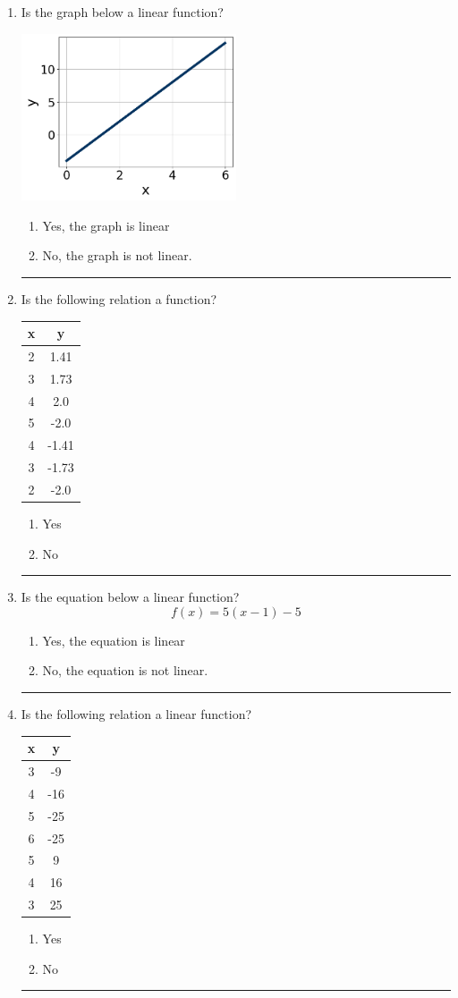 \documentclass[14pt]{extbook}
\newcommand{\litem}[1]{\item#1\hspace*{-1cm}\rule{\textwidth}{0.4pt}}
\begin{document}
\begin{enumerate}
{\begin{enumerate}[label=\Alph*.]
\end{enumerate} }
\litem{
Is the graph below a linear function?
\begin{center}
    \includegraphics[width=0.5\textwidth]{../Figures/MA_8_F_1_2_graphI.png}
\end{center}
\begin{enumerate}[label=\Alph*.]
\item Yes, the graph is linear
\item No, the graph is not linear.

\end{enumerate} }
\litem{
Is the following relation a function?

\begin{tabular}{c|c}
x &y\tabularnewline \hline
2 &1.41\tabularnewline \hline
3 &1.73\tabularnewline \hline
4 &2.0\tabularnewline \hline
5 &-2.0\tabularnewline \hline
4 &-1.41\tabularnewline \hline
3 &-1.73\tabularnewline \hline
2 &-2.0\end{tabular}\begin{enumerate}[label=\Alph*.]
\item Yes
\item No

\end{enumerate} }
\litem{
Is the equation below a linear function?\[ f(x) = 5(x -1)-5 \]\begin{enumerate}[label=\Alph*.]
\item Yes, the equation is linear
\item No, the equation is not linear.

\end{enumerate} }
\litem{
Is the following relation a linear function?

\begin{tabular}{c|c}
x &y\tabularnewline \hline
3 &-9\tabularnewline \hline
4 &-16\tabularnewline \hline
5 &-25\tabularnewline \hline
6 &-25\tabularnewline \hline
5 &9\tabularnewline \hline
4 &16\tabularnewline \hline
3 &25\end{tabular}\begin{enumerate}[label=\Alph*.]
\item Yes
\item No


\end{enumerate}}
\end{enumerate}
\end{document}

